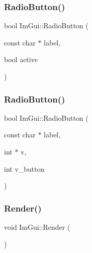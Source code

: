 \hypertarget{namespace_im_gui_a6b146763845cbad5a4144772279631bc}{}\label{namespace_im_gui_a6b146763845cbad5a4144772279631bc} 
\subsubsection{\texorpdfstring{Radio\+Button()}{RadioButton()}\hspace{0.1cm}{\footnotesize\ttfamily [1/2]}}
{\footnotesize\ttfamily bool Im\+Gui\+::\+Radio\+Button (\begin{DoxyParamCaption}\item[{const char $\ast$}]{label,  }\item[{bool}]{active }\end{DoxyParamCaption})}

\hypertarget{namespace_im_gui_a018d2b61d2f00bb7a9dd2b1f933b93a5}{}\label{namespace_im_gui_a018d2b61d2f00bb7a9dd2b1f933b93a5} 
\subsubsection{\texorpdfstring{Radio\+Button()}{RadioButton()}\hspace{0.1cm}{\footnotesize\ttfamily [2/2]}}
{\footnotesize\ttfamily bool Im\+Gui\+::\+Radio\+Button (\begin{DoxyParamCaption}\item[{const char $\ast$}]{label,  }\item[{int $\ast$}]{v,  }\item[{int}]{v\+\_\+button }\end{DoxyParamCaption})}

\hypertarget{namespace_im_gui_ab51a164f547317c16c441f1599e3946d}{}\label{namespace_im_gui_ab51a164f547317c16c441f1599e3946d} 
\subsubsection{\texorpdfstring{Render()}{Render()}}
{\footnotesize\ttfamily void Im\+Gui\+::\+Render (\begin{DoxyParamCaption}{ }\end{DoxyParamCaption})}

\hypertarget{namespace_im_gui_a2d0e4160081b3953fc8f88e2d8e8da15}{}\label{namespace_im_gui_a2d0e4160081b3953fc8f88e2d8e8da15} 
